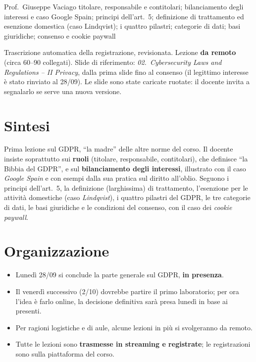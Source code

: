   {Prof.~Giuseppe Vaciago}
  {titolare, responsabile e contitolari; bilanciamento degli interessi e caso Google Spain; principi
   dell'art.~5; definizione di trattamento ed esenzione domestica (caso Lindqvist); i quattro pilastri;
   categorie di dati; basi giuridiche; consenso e cookie paywall}
\label{lez:2026-09-25}

\begin{nota}[Fonte]
Trascrizione automatica della registrazione, revisionata. Lezione \textbf{da remoto} (circa 60--90
collegati). Slide di riferimento: \emph{02.~Cybersecurity Laws and Regulations -- II Privacy}, dalla
prima slide fino al consenso (il legittimo interesse è stato rinviato al 28/09). Le slide sono state
caricate ruotate: il docente invita a segnalarlo se serve una nuova versione.
\end{nota}

\section{Sintesi}
Prima lezione sul GDPR, ``la madre'' delle altre norme del corso. Il docente insiste soprattutto sui
\textbf{ruoli} (titolare, responsabile, contitolari), che definisce ``la Bibbia del GDPR'', e sul
\textbf{bilanciamento degli interessi}, illustrato con il caso \emph{Google Spain} e con esempi dalla
sua pratica sul diritto all'oblio. Seguono i principi dell'art.~5, la definizione (larghissima) di
trattamento, l'esenzione per le attività domestiche (caso \emph{Lindqvist}), i quattro pilastri del
GDPR, le tre categorie di dati, le basi giuridiche e le condizioni del consenso, con il caso dei
\emph{cookie paywall}.

\section{Organizzazione}
\begin{itemize}
  \item Lunedì 28/09 si conclude la parte generale sul GDPR, \textbf{in presenza}.
  \item Il venerdì successivo (2/10) dovrebbe partire il primo laboratorio; per ora l'idea è farlo
    online, la decisione definitiva sarà presa lunedì in base ai presenti.
  \item Per ragioni logistiche e di aule, alcune lezioni in più si svolgeranno da remoto.
  \item Tutte le lezioni sono \textbf{trasmesse in streaming e registrate}; le registrazioni sono
    sulla piattaforma del corso.
\end{itemize}


